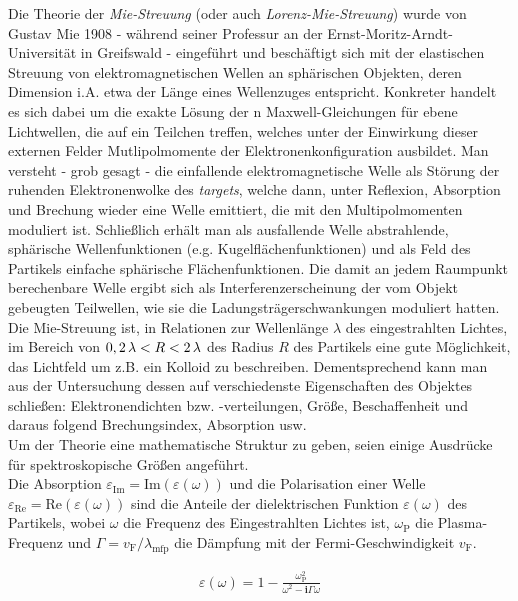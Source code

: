 \documentclass[numbers=noenddot,a4paper,notitlepage,twoside,BCOR15mm]{scrartcl}
\newcommand{\ix}[1]{_\text{#1}}
\newcommand{\imag}{\mathbf{i}}
\newcommand{\tilt}[1]{\textit{#1}}
\begin{document}
			Die Theorie der \tilt{Mie-Streuung} (oder auch \tilt{Lorenz-Mie-Streuung}) wurde von Gustav Mie 1908 - während seiner Professur an der Ernst-Moritz-Arndt-Universität in Greifswald - eingeführt und beschäftigt sich mit der elastischen Streuung von elektromagnetischen Wellen an sphärischen Objekten, deren Dimension i.A. etwa der Länge eines Wellenzuges entspricht. Konkreter handelt es sich dabei um die exakte Lösung der n Maxwell-Gleichungen für ebene Lichtwellen, die auf ein Teilchen treffen, welches unter der Einwirkung dieser externen Felder Mutlipolmomente der Elektronenkonfiguration ausbildet. Man versteht - grob gesagt - die einfallende elektromagnetische Welle als Störung der ruhenden Elektronenwolke des \tilt{targets}, welche dann, unter Reflexion, Absorption und Brechung wieder eine Welle emittiert, die mit den Multipolmomenten moduliert ist. Schließlich erhält man als ausfallende Welle abstrahlende, sphärische Wellenfunktionen (e.g. Kugelflächenfunktionen) und als Feld des Partikels einfache sphärische Flächenfunktionen. Die damit an jedem Raumpunkt berechenbare Welle ergibt sich als Interferenzerscheinung der vom Objekt gebeugten Teilwellen, wie sie die Ladungsträgerschwankungen moduliert hatten.\\
			Die Mie-Streuung ist, in Relationen zur Wellenlänge $\lambda$ des eingestrahlten Lichtes, im Bereich von $\unit[0,2]{\lambda}<R<\unit[2]{\lambda}$ des Radius $R$ des Partikels eine gute Möglichkeit, das Lichtfeld um z.B. ein Kolloid zu beschreiben. Dementsprechend kann man aus der Untersuchung dessen auf verschiedenste Eigenschaften des Objektes schließen: Elektronendichten bzw. -verteilungen, Größe, Beschaffenheit und daraus folgend Brechungsindex, Absorption usw.\\
			Um der Theorie eine mathematische Struktur zu geben, seien einige Ausdrücke für spektroskopische Größen angeführt.\\
			Die Absorption $\varepsilon\ix{Im}=\text{Im}\left(\varepsilon\left(\omega\right)\right)$ und die Polarisation einer Welle $\varepsilon\ix{Re}=\text{Re}\left(\varepsilon\left(\omega\right)\right)$ sind die Anteile der dielektrischen Funktion $\varepsilon\left(\omega\right)$ des Partikels, wobei $\omega$ die Frequenz des Eingestrahlten Lichtes ist, $\omega\ix{P}$ die Plasma-Frequenz und $\Gamma=v\ix{F}/\lambda\ix{mfp}$ die Dämpfung mit der Fermi-Geschwindigkeit $v\ix{F}$.

				\begin{align}
					\varepsilon\left(\omega\right)=1-\frac{\omega\ix{P}^2}{\omega^2-\imag\Gamma\omega}
				\end{align}
\end{document}
